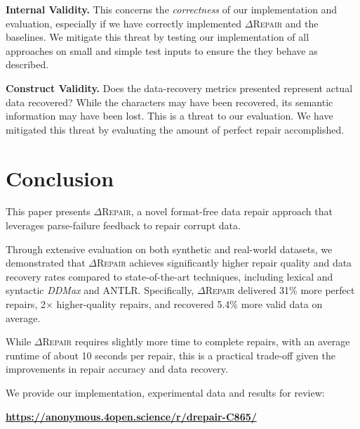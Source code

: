\documentclass[acmsmall,screen,review,anonymous]{acmart}
\newcommand{\formatfree}{format-free\xspace}
\newcommand{\dtask}{data repair\xspace}
\newcommand{\approach}{\textsc{$\Delta$Repair}\xspace}
\newcommand{\ddmax}{\textit{DDMax}\xspace}
\newcommand{\drepair}{\approach}
\begin{document}
\noindent\textbf{Internal Validity.} This concerns the \textit{correctness} of our implementation and evaluation, especially if we have correctly implemented \approach and the baselines. We mitigate this threat by testing our implementation of all approaches on small and simple test inputs to ensure the they behave as described. 

\noindent\textbf{Construct Validity.} 
Does the data-recovery metrics presented
represent actual data recovered? While the characters may have been recovered,
its semantic information may have been lost. This is a threat to our evaluation.
We have mitigated this threat by evaluating the amount of perfect repair accomplished.


\section{Conclusion}
\label{sec:conclusion}

This paper presents \drepair, a novel \formatfree \dtask approach that
leverages parse-failure feedback to repair corrupt data.

Through extensive evaluation on both synthetic and real-world
datasets, we demonstrated that \drepair achieves significantly higher repair
quality and data recovery rates compared to state-of-the-art techniques,
including lexical and syntactic \ddmax and ANTLR. Specifically, \drepair
delivered 31\% more perfect repairs, %
2$\times$ higher-quality repairs, %
and recovered 5.4\% more valid data on average. %

While \drepair requires slightly more time to complete repairs, with an average
runtime of about 10 seconds per repair, this is a practical trade-off given the
improvements in repair accuracy and data recovery.

We provide our implementation, experimental data and results for review:

\begin{center}
   \textbf{\url{https://anonymous.4open.science/r/drepair-C865/}} %
\end{center}




\end{document}
